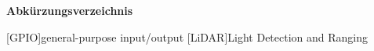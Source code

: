 \Huge\bf Abkürzungsverzeichnis \\
\normalsize\rm

\begin{acronym}

[GPIO]{general-purpose input/output}
[LiDAR]{Light Detection and Ranging}
    
\end{acronym}

\newpage